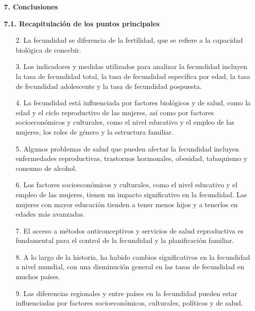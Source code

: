 \documentclass[8pt,a4paper]{beamer}
\begin{document}
{\begin{frame}{\textbf{7. Conclusiones}}
\begin{block}{\textbf{7.1. Recapitulación de los puntos principales}}
\begin{enumerate}
\item[2.] La fecundidad se diferencia de la fertilidad, que se refiere a la capacidad biológica de concebir.

\item[3.] Los indicadores y medidas utilizados para analizar la fecundidad incluyen la tasa de fecundidad total, la tasa de fecundidad específica por edad, la tasa de fecundidad adolescente y la tasa de fecundidad pospuesta.

\item[4.] La fecundidad está influenciada por factores biológicos y de salud, como la edad y el ciclo reproductivo de las mujeres, así como por factores socioeconómicos y culturales, como el nivel educativo y el empleo de las mujeres, los roles de género y la estructura familiar.

\end{enumerate}
\end{block}
\end{frame}

\begin{frame}{}
\begin{block}{}
\setlength{\parskip}{3px}
\justifying
\begin{enumerate}
\setlength{\parskip}{3px}
\justifying
\item[5.] Algunos problemas de salud que pueden afectar la fecundidad incluyen enfermedades reproductivas, trastornos hormonales, obesidad, tabaquismo y consumo de alcohol.

\item[6.] Los factores socioeconómicos y culturales, como el nivel educativo y el empleo de las mujeres, tienen un impacto significativo en la fecundidad. Las mujeres con mayor educación tienden a tener menos hijos y a tenerlos en edades más avanzadas.

\item[7.] El acceso a métodos anticonceptivos y servicios de salud reproductiva es fundamental para el control de la fecundidad y la planificación familiar.

\item[8.] A lo largo de la historia, ha habido cambios significativos en la fecundidad a nivel mundial, con una disminución general en las tasas de fecundidad en muchos países.

\item[9.] Las diferencias regionales y entre países en la fecundidad pueden estar influenciadas por factores socioeconómicos, culturales, políticos y de salud.
\end{enumerate}
\end{block}
\end{frame}


}
\end{document}
